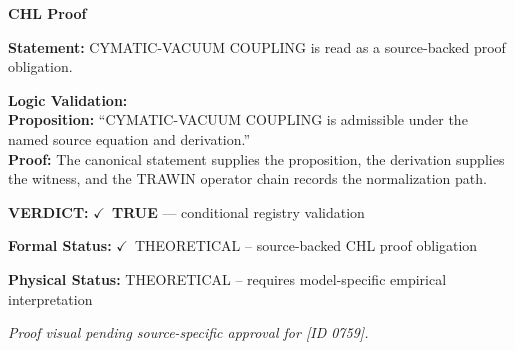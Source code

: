 \vspace{0.45em}
\noindent\textbf{CHL Proof}\par
\textbf{Statement:} CYMATIC-VACUUM COUPLING is read as a source-backed proof obligation.

\textbf{Logic Validation:}\\
\textbf{Proposition:} ``CYMATIC-VACUUM COUPLING is admissible under the named source equation and derivation.''\\
\textbf{Proof:} The canonical statement supplies the proposition, the derivation supplies the witness, and the TRAWIN operator chain records the normalization path.

\textbf{VERDICT:} \ensuremath{\checkmark}\ \textbf{TRUE} --- conditional registry validation

\textbf{Formal Status:} \ensuremath{\checkmark}\ THEORETICAL -- source-backed CHL proof obligation

\textbf{Physical Status:} THEORETICAL -- requires model-specific empirical interpretation
\par\vspace{0.45em}
\par
\vfill
\begingroup\footnotesize\itshape
Proof visual pending source-specific approval for [ID 0759].
\par\endgroup
\vfill
\endgroup
\endgroup
